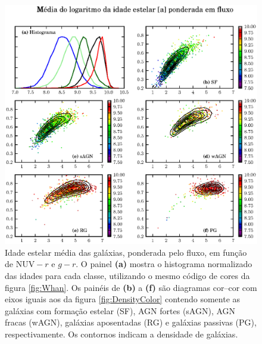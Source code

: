 \begin{figure}
	\includegraphics{figuras/uvcolor-color-at_flux-byclass.eps}
	\caption[Idade estelar média ponderada em fluxo no diagrama cor--cor.]
	{Idade estelar média das galáxias, ponderada pelo fluxo, em função de
	$\mathrm{NUV}-r$ e $g-r$. O painel \textbf{(a)} mostra o histograma normalizado
	das idades para cada classe, utilizando o mesmo código de cores da figura
	\ref{fig:Whan}. Os painéis de \textbf{(b)} a \textbf{(f)} são diagramas
	cor--cor com eixos iguais aos da figura \ref{fig:DensityColor} contendo somente
	as galáxias com formação estelar (SF), AGN fortes (sAGN), AGN fracas (wAGN),
	galáxias aposentadas (RG) e galáxias passivas (PG), respectivamente. Os
	contornos indicam a densidade de galáxias.}
	\label{fig:ATFluxColor}
\end{figure}

